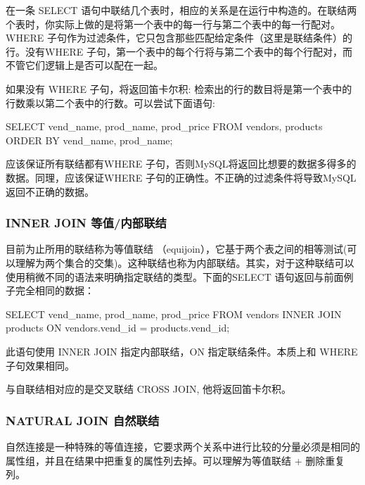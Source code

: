 在一条 SELECT 语句中联结几个表时，相应的关系是在运行中构造的。在联结两个表时，你实际上做的是将第一个表中的每一行与第二个表中的每一行配对。WHERE 子句作为过滤条件，它只包含那些匹配给定条件（这里是联结条件）的行。没有WHERE 子句，第一个表中的每个行将与第二个表中的每个行配对，而不管它们逻辑上是否可以配在一起。

如果没有 WHERE 子句，将返回笛卡尔积: 检索出的行的数目将是第一个表中的行数乘以第二个表中的行数。可以尝试下面语句:

\begin{sql}
SELECT vend_name, prod_name, prod_price
    FROM vendors, products
    ORDER BY vend_name, prod_name;
\end{sql}

应该保证所有联结都有WHERE 子句，否则MySQL将返回比想要的数据多得多的数据。同理，应该保证WHERE 子句的正确性。不正确的过滤条件将导致MySQL返回不正确的数据。

\subsubsection{INNER JOIN 等值/内部联结}

目前为止所用的联结称为等值联结 （equijoin），它基于两个表之间的相等测试(可以理解为两个集合的交集)。这种联结也称为内部联结。其实，对于这种联结可以使用稍微不同的语法来明确指定联结的类型。下面的SELECT 语句返回与前面例子完全相同的数据：

\begin{sql}
SELECT vend_name, prod_name, prod_price
    FROM vendors INNER JOIN products
    ON vendors.vend_id = products.vend_id;
\end{sql}

此语句使用 INNER JOIN 指定内部联结，ON 指定联结条件。本质上和 WHERE 子句效果相同。

与自联结相对应的是交叉联结 CROSS JOIN, 他将返回笛卡尔积。


\subsubsection{NATURAL JOIN 自然联结}

自然连接是一种特殊的等值连接，它要求两个关系中进行比较的分量必须是相同的属性组，并且在结果中把重复的属性列去掉。可以理解为等值联结 + 删除重复列。

